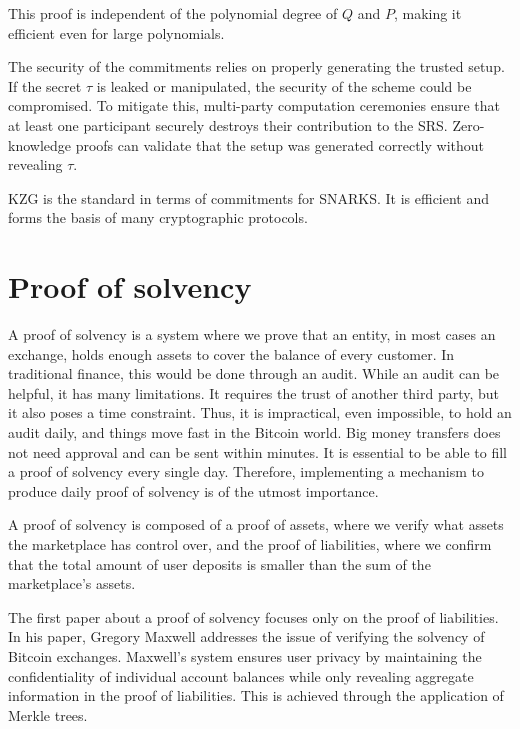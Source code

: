 This proof is independent of the polynomial degree of $Q$ and $P$, making it efficient even for large polynomials.


The security of the commitments relies on properly generating the trusted setup. 
If the secret $\tau$ is leaked or manipulated, the security of the scheme could be compromised. 
To mitigate this, multi-party computation ceremonies ensure that at least one participant securely destroys their contribution to the SRS. 
Zero-knowledge proofs can validate that the setup was generated correctly without revealing $\tau$.

KZG is the standard in terms of commitments for SNARKS. It is efficient and forms the basis of many cryptographic protocols. \cite{vODC24}


\section{Proof of solvency}

A proof of solvency is a system where we prove that an entity, in most cases an exchange, holds enough assets to cover
the balance of every customer. In traditional finance, this would be done through an audit. While an audit can be helpful,
it has many limitations. It requires the trust of another third party, but it also poses a time constraint. Thus, it is impractical, even impossible, to hold an audit daily, and things move fast in the Bitcoin world.
Big money transfers does not need approval and can be sent within minutes. It is essential to be able to fill a proof of solvency every single day.
Therefore, implementing a mechanism to produce daily proof of solvency is of the utmost importance.

A proof of solvency is composed of a proof of assets, where we verify what assets the marketplace has control over, and the proof of liabilities, 
where we confirm that the total amount of user deposits is smaller than the sum of the marketplace's assets.

The first paper about a proof of solvency focuses only on the proof of liabilities. In his paper, Gregory Maxwell addresses the issue of verifying
the solvency of Bitcoin exchanges. \cite{chainlink_blog}
Maxwell's system ensures user privacy by maintaining the confidentiality of individual account balances while only revealing aggregate information in the proof of liabilities.
This is achieved through the application of Merkle trees.



